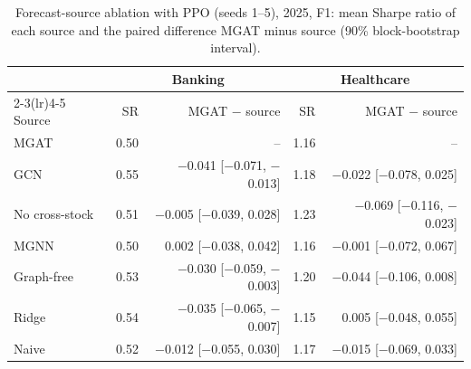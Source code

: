 \begin{table}[!t]\centering\small\color{blue}
\caption{Forecast-source ablation with PPO (seeds 1--5), 2025, F1: mean Sharpe ratio of each source and the paired difference MGAT minus source (90\% block-bootstrap interval).}
\label{tab:ablation_ppo}
\setlength{\tabcolsep}{3pt}
\begin{tabular}{lrrrr}\toprule
 & \multicolumn{2}{c}{Banking} & \multicolumn{2}{c}{Healthcare} \\ \cmidrule(lr){2-3}\cmidrule(lr){4-5}
Source & SR & MGAT $-$ source & SR & MGAT $-$ source \\ \midrule
MGAT & 0.50 & -- & 1.16 & -- \\
GCN & 0.55 & $-$0.041 [$-$0.071, $-$0.013] & 1.18 & $-$0.022 [$-$0.078, 0.025] \\
No cross-stock & 0.51 & $-$0.005 [$-$0.039, 0.028] & 1.23 & $-$0.069 [$-$0.116, $-$0.023] \\
MGNN & 0.50 & 0.002 [$-$0.038, 0.042] & 1.16 & $-$0.001 [$-$0.072, 0.067] \\
Graph-free & 0.53 & $-$0.030 [$-$0.059, $-$0.003] & 1.20 & $-$0.044 [$-$0.106, 0.008] \\
Ridge & 0.54 & $-$0.035 [$-$0.065, $-$0.007] & 1.15 & 0.005 [$-$0.048, 0.055] \\
Naive & 0.52 & $-$0.012 [$-$0.055, 0.030] & 1.17 & $-$0.015 [$-$0.069, 0.033] \\
\bottomrule\end{tabular}
\end{table}